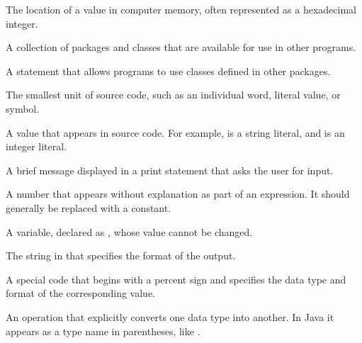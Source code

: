 {{\begin{description}
The location of a value in computer memory, often represented as a hexadecimal integer.

A collection of packages and classes that are available for use in other programs.





A statement that allows programs to use classes defined in other packages.

The smallest unit of source code, such as an individual word, literal value, or symbol.



A value that appears in source code.
For example,  is a string literal, and  is an integer literal.

A brief message displayed in a print statement that asks the user for input.

A number that appears without explanation as part of an expression.
It should generally be replaced with a constant.

A variable, declared as , whose value cannot be changed.

The string in  that specifies the format of the output.

A special code that begins with a percent sign and specifies the data type and format of the corresponding value.

An operation that explicitly converts one data type into another.
In Java it appears as a type name in parentheses, like .


\end{description}}}
